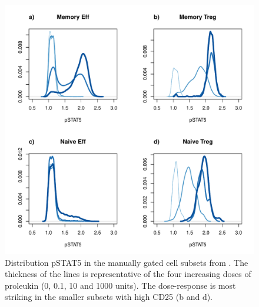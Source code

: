 \hspace{-2cm}
\begin{figure}[h]
\centering
\includegraphics[scale=.45]{IL2/figures/dose-effect-pstat5-cellsubsets-density.pdf}
\caption{ \label{figure:dose-effect-pstat5-cellsubsets}
Distribution pSTAT5 in the manually gated cell subsets from .
The thickness of the lines is representative of the four increasing doses of proleukin (0, 0.1, 10 and 1000 units).
The dose-response is most striking in the smaller subsets with high CD25 (b and d).
}
\end{figure}



